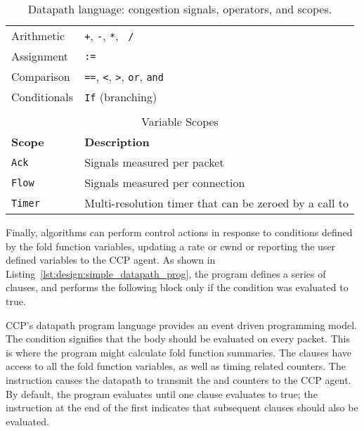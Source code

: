 \begin{table}
\begin{tabular}{@{} p{}p{}}
        Arithmetic & \texttt{+}, \texttt{-}, \texttt{*}, \texttt{~/} \\
        Assignment & \texttt{:=} \\
        Comparison & \texttt{==}, \texttt{<}, \texttt{>}, \texttt{or}, \texttt{and} \\
        Conditionals & \texttt{If} (branching) \\
        & \\
        \hline
        \hline
        \multicolumn{2}{c}{Variable Scopes} \\
        \hline
        \hline
        \textbf{Scope} & \textbf{Description} \\
        \texttt{Ack} & Signals measured per packet \\
        \texttt{Flow} & Signals measured per connection \\
        \texttt{Timer} & Multi-resolution timer that can be zeroed by a call to \ct{reset} \\
    \end{tabular}
    \caption{Datapath language: congestion signals, operators, and scopes.}\label{tab:api}
\end{table}
%

Finally, algorithms can perform control actions in response to conditions defined by the fold function variables, \eg updating a rate or cwnd or reporting the user defined variables to the CCP agent.
As shown in Listing~\ref{lst:design:simple_datapath_prog}, the program defines a series of  clauses, and performs the following block only if the condition was evaluated to true.

CCP's datapath program language provides an event driven programming model.
The condition  signifies that the body should be evaluated on every packet.
This is where the program might calculate fold function summaries.
The  clauses have access to all the fold function variables, as well as timing related counters.
The  instruction causes the datapath to transmit the  and  counters to the CCP agent.
By default, the program evaluates until one  clause evaluates to true; the  instruction at the end of the first  indicates that subsequent  clauses should also be evaluated.


